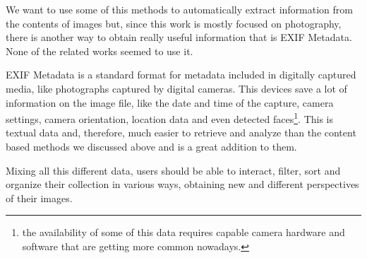 We want to use some of this methods to automatically extract information from the contents of images but, since this work is mostly focused on photography, there is another way to obtain really useful information that is EXIF Metadata. None of the related works seemed to use it.

EXIF Metadata is a standard format for metadata included in digitally captured media, like photographs captured by digital cameras. This devices save a lot of information on the image file, like the date and time of the capture, camera settings, camera orientation, location data and even detected faces\footnote{the availability of some of this data requires capable camera hardware and software that are getting more common nowadays.}. This is textual data and, therefore, much easier to retrieve and analyze than the content based methods we discussed above and is a great addition to them.

Mixing all this different data, users should be able to interact, filter, sort and organize their collection in various ways, obtaining new and different perspectives of their images.



